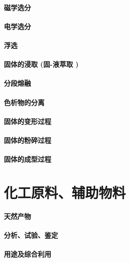 \documentclass[UTF8]{../../ApplicationUniverse}
\begin{document}
        \subsubsection{磁学选分}
        \subsubsection{电学选分}
        \subsubsection{浮选}
        \subsubsection{固体的浸取 (固-液萃取 )}
        \subsubsection{分段熔融}
        \subsubsection{色析物的分离}
\subsubsection{固体的变形过程}
    \subsubsection{固体的粉碎过程}
    \subsubsection{固体的成型过程}








\chapter{化工原料、辅助物料}
\subsubsection{天然产物}
    \subsubsection{分析、试验、鉴定}
    \subsubsection{用途及综合利用}
\end{document}

